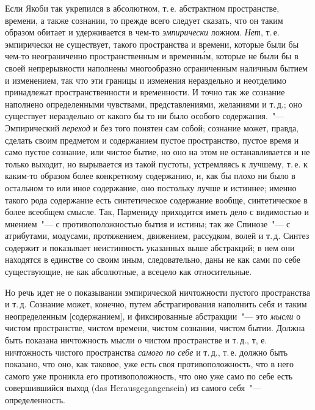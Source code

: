 Если Якоби так укрепился в абсолютном, т.\,е. абстрактном
пространстве, времени, а также сознании, то
прежде всего следует сказать, что он таким образом обитает
и удерживается в чем-то \emph{эмпирически} ложном. \emph{Нет},
т.\,е. эмпирически не существует, такого пространства и
времени, которые были бы чем-то неограниченно пространственным
и временн\'ым, которые не были бы в своей
непрерывности наполнены многообразно ограниченным
наличным бытием и изменением, так что эти границы и
изменения нераздельно и неотделимо принадлежат пространственности
и временности. И точно так же сознание
наполнено определенными чувствами, представлениями,
желаниями и т.\,д.; оно существует нераздельно от какого
бы то ни было особого содержания.~"--- Эмпирический
\emph{переход} и без того понятен сам собой; сознание может,
правда, сделать своим предметом и содержанием пустое
пространство, пустое время и само пустое сознание, или
чистое бытие, но оно на этом не останавливается и не
только выходит, но вырывается из такой пустоты, устремляясь
к лучшему, т.\,е. к каким-то образом более конкретному
содержанию, и, как бы плохо ни было в остальном
то или иное содержание, оно постольку лучше и истиннее;
именно такого рода содержание есть синтетическое
содержание вообще, синтетическое в более всеобщем
смысле. Так, Пармениду приходится иметь дело с видимостью
и мнением~"--- с противоположностью бытия и
истины; так же Спинозе~"--- с атрибутами, модусами, протяжением,
движением, рассудком, волей и т.\,д. Синтез
содержит и показывает неистинность указанных выше
абстракций; в нем они находятся в единстве со своим
иным, следовательно, даны не как сами по себе существующие,
не как абсолютные, а всецело как относительные.

Но речь идет не о показывании эмпирической ничтожности
пустого пространства и т.\,д. Сознание может, конечно,
путем абстрагирования наполнить себя и таким неопределенным
[содержанием], и фиксированные абстракции~"---
это \emph{мысли} о чистом пространстве, чистом времени, чистом
сознании, чистом бытии. Должна быть показана
ничтожность мысли о чистом пространстве и т.\,д., т, е.
ничтожность чистого пространства \emph{самого по себе} и т.\,д.,
т.\,е. должно быть показано, что оно, как таковое, уже
есть своя противоположность, что в него самого уже проникла
его противоположность, что оно уже само по себе
есть совершившийся выход (das Herausgegangensein) из
самого себя~"--- определенность.

